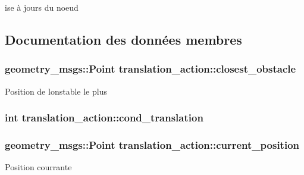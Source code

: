 ise à jours du noeud 



\subsection{Documentation des données membres}
\subsubsection[{\texorpdfstring{closest\+\_\+obstacle}{closest_obstacle}}]{\setlength{\rightskip}{0pt plus 5cm}geometry\+\_\+msgs\+::\+Point translation\+\_\+action\+::closest\+\_\+obstacle\hspace{0.3cm}{\ttfamily [private]}}\hypertarget{classtranslation__action_a3057bf4271e7198ad8ded2daf07f8f4e}{}\label{classtranslation__action_a3057bf4271e7198ad8ded2daf07f8f4e}
Position de l\textquotesingle{}onstable le plus 
\subsubsection[{\texorpdfstring{cond\+\_\+translation}{cond_translation}}]{\setlength{\rightskip}{0pt plus 5cm}int translation\+\_\+action\+::cond\+\_\+translation\hspace{0.3cm}{\ttfamily [private]}}\hypertarget{classtranslation__action_a421febcf8951d829dc2d6f1087cc1fc5}{}\label{classtranslation__action_a421febcf8951d829dc2d6f1087cc1fc5}
\subsubsection[{\texorpdfstring{current\+\_\+position}{current_position}}]{\setlength{\rightskip}{0pt plus 5cm}geometry\+\_\+msgs\+::\+Point translation\+\_\+action\+::current\+\_\+position\hspace{0.3cm}{\ttfamily [private]}}\hypertarget{classtranslation__action_ab631cf920d18e691fcafb05c5d014baf}{}\label{classtranslation__action_ab631cf920d18e691fcafb05c5d014baf}
Position courrante 
